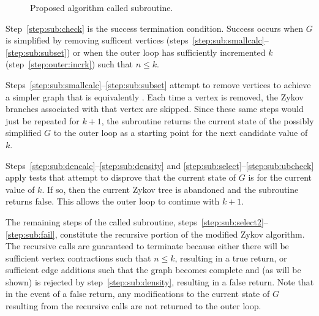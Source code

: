 \begin{figure}[H]
{
  }
  \caption{Proposed algorithm called subroutine.}
  \label{fig:called}
\end{figure}

Step~\ref{step:sub:check} is the success termination condition.  Success occurs when \(G\) is simplified by
removing sufficent vertices (steps~\ref{step:sub:smallcalc}--\ref{step:sub:subset}) or when the outer loop has
sufficiently incremented \(k\) (step~\ref{step:outer:incrk}) such that \(n\le k\).

Steps~\ref{step:sub:smallcalc}--\ref{step:sub:subset} attempt to remove vertices to achieve a simpler graph that is
equivalently .  Each time a vertex is removed, the Zykov branches associated with that vertex are
skipped.  Since these same steps would just be repeated for \(k+1\), the subroutine returns the current state of
the possibly simplified \(G\) to the outer loop as a starting point for the next candidate value of \(k\).

Steps~\ref{step:sub:dencalc}--\ref{step:sub:density} and \ref{step:sub:select}--\ref{step:sub:ubcheck} apply tests
that attempt to disprove that the current state of \(G\) is  for the current value of \(k\).  If so,
then the current Zykov tree is abandoned and the subroutine returns false.  This allows the outer loop to continue
with \(k+1\).

The remaining steps of the called subroutine, steps~\ref{step:sub:select2}--\ref{step:sub:fail}, constitute the
recursive portion of the modified Zykov algorithm.  The recursive calls are guaranteed to terminate because either
there will be sufficient vertex contractions such that \(n\le k\), resulting in a true return, or sufficient edge
additions such that the graph becomes complete and (as will be shown) is rejected by step~\ref{step:sub:density},
resulting in a false return.  Note that in the event of a false return, any modifications to the current state of
\(G\) resulting from the recursive calls are not returned to the outer loop.

